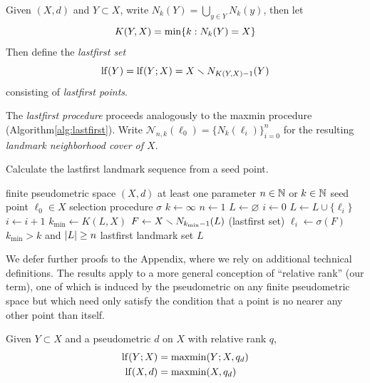 \documentclass{article}
\begin{document}
\begin{definition}
    Given $(X,d)$ and $Y \subset X$, write $N_k(Y) = \bigcup_{y \in Y}{N_k(y)}$, then let
    $$K(Y,X) = \min\{ k : N_k(Y) = X \}$$
    Then define the \emph{lastfirst set}
    $$\operatorname{lf}(Y) = \operatorname{lf}(Y;X) = X \smallsetminus N_{K(Y,X) - 1}(Y)$$
    consisting of \emph{lastfirst points}.
\end{definition}

The \emph{lastfirst procedure} proceeds analogously to the maxmin
procedure (Algorithm\nbs\ref{alg:lastfirst}). Write
\(\mathcal{N}_{n,k}(\ell_0) = \{ N_k(\ell_i) \}_{i=0}^{n}\) for the
resulting \emph{landmark neighborhood cover of \(X\)}.

\begin{algorithm}
\caption{Calculate the lastfirst landmark sequence from a seed point.}
\label{alg:lastfirst}
\begin{algorithmic}[1]
\REQUIRE finite pseudometric space $(X,d)$
\REQUIRE at least one parameter $n \in \mathbb{N}$ or $k \in \mathbb{N}$
\REQUIRE seed point $\ell_0 \in X$
\REQUIRE selection procedure $\sigma$
    \STATE $k \leftarrow \infty$
\ENDIF
{}
    \STATE $n \leftarrow 1$
\ENDIF
\STATE $L \leftarrow \varnothing$
\STATE $i \leftarrow 0$
\REPEAT
    \STATE $L \leftarrow L\cup\{\ell_i\}$
    \STATE $i \leftarrow i+1$
    \STATE $k_{\min} \leftarrow K(L,X)$
    \STATE $F \leftarrow X \smallsetminus N_{k_{\min}-1}(L)$ (lastfirst set)
    \STATE $\ell_i \leftarrow \sigma(F)$
\UNTIL $k_{\min} > k$ and $\lvert L\rvert \geq n$
\RETURN lastfirst landmark set $L$
\end{algorithmic}
\end{algorithm}

We defer further proofs to the Appendix, where we rely on additional
technical definitions. The results apply to a more general conception of
``relative rank'' (our term), one of which is induced by the
pseudometric on any finite pseudometric space but which need only
satisfy the condition that a point is no nearer any other point than
itself.

\begin{corollary}
    Given $Y\subset X$ and a pseudometric $d$ on $X$ with relative rank $q$,
    \begin{align*}
        \operatorname{lf}(Y;X) &= \operatorname{maxmin}(Y;X,q_d) \\
        \operatorname{lf}(X,d) &= \operatorname{maxmin}(X,q_d)
    \end{align*}
\end{corollary}
\end{document}
